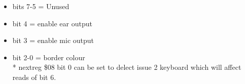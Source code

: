 \begin{itemize}
\item[] bits 7-5 = Unused
\item[] bit 4 = enable ear output 
\item[] bit 3 = enable mic output
\item[] bit 2-0 = border colour\\
* nextreg \$08 bit 0 can be set to delect issue 2 keyboard which will
  affect reads of bit 6.
\end{itemize}
